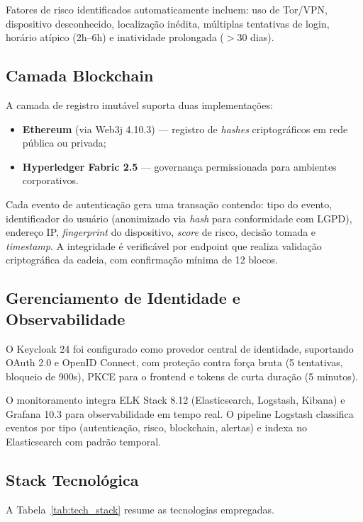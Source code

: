 \documentclass[12pt]{article}
\begin{document}
Fatores de risco identificados automaticamente incluem: uso de Tor/VPN, dispositivo desconhecido, localização inédita, múltiplas tentativas de login, horário atípico (2h--6h) e inatividade prolongada ($>$30 dias).

\subsection{Camada Blockchain}

A camada de registro imutável suporta duas implementações:

\begin{itemize}[leftmargin=*]
    \item \textbf{Ethereum} (via Web3j 4.10.3) --- registro de \textit{hashes} criptográficos em rede pública ou privada;
    \item \textbf{Hyperledger Fabric 2.5} --- governança permissionada para ambientes corporativos.
\end{itemize}

Cada evento de autenticação gera uma transação contendo: tipo do evento, identificador do usuário (anonimizado via \textit{hash} para conformidade com LGPD), endereço IP, \textit{fingerprint} do dispositivo, \textit{score} de risco, decisão tomada e \textit{timestamp}. A integridade é verificável por endpoint que realiza validação criptográfica da cadeia, com confirmação mínima de 12 blocos.

\subsection{Gerenciamento de Identidade e Observabilidade}

O Keycloak 24 foi configurado como provedor central de identidade, suportando OAuth 2.0 e OpenID Connect, com proteção contra força bruta (5 tentativas, bloqueio de 900s), PKCE para o frontend e tokens de curta duração (5 minutos).

O monitoramento integra ELK Stack 8.12 (Elasticsearch, Logstash, Kibana) e Grafana 10.3 para observabilidade em tempo real. O pipeline Logstash classifica eventos por tipo (autenticação, risco, blockchain, alertas) e indexa no Elasticsearch com padrão temporal.

\subsection{Stack Tecnológica}

A Tabela~\ref{tab:tech_stack} resume as tecnologias empregadas.
\end{document}

